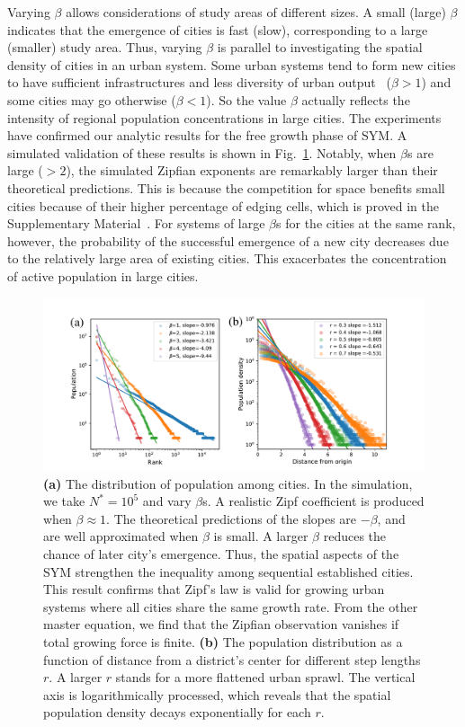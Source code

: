\documentclass[reprint,unsortedaddress,amsmath,amssymb,aps,prl,showkeys]{revtex4-2}
\begin{document}
Varying $\beta$ allows considerations of study areas of different sizes. A small (large) $\beta$ indicates that the emergence of cities is fast (slow), corresponding to a large (smaller) study area. %
Thus, varying $\beta$ is parallel to investigating the spatial density of cities in an urban system. Some urban systems tend to form new cities to have sufficient infrastructures and less diversity of urban output~\cite{batty2008size} ($\beta > 1$) and some cities may go otherwise ($\beta< 1$). So the value $\beta$ actually reflects the intensity of regional population concentrations in large cities. The experiments have confirmed our analytic results for the free growth phase of SYM. %
A simulated validation of these results is shown in Fig.~\ref{Fig2}. Notably, when $\beta$s are large ($>2$), the simulated Zipfian exponents are remarkably larger than their theoretical predictions. This is because the competition for space benefits small %
cities because of their higher percentage of edging cells, which is proved in the Supplementary Material~\cite{SuppInfo}. For systems of large $\beta$s for the cities at the same rank, however, the probability of the successful emergence of a new city decreases due to the relatively large area of existing cities. This exacerbates the concentration of active population in large cities.%
\begin{figure}[t]
	\centering
	\includegraphics[width = .99\linewidth]{pics/Zipf_Clark.pdf}
	\caption{\textbf{(a)} The distribution of population among cities. In the simulation, we take $N^* = 10^5$ and vary $\beta$s. A realistic Zipf coefficient is produced when $\beta\approx 1$. The theoretical predictions of the slopes are $-\beta$, and are well approximated when $\beta$ is small. A larger $\beta$ reduces the chance of later city's emergence. Thus, the spatial aspects of the SYM strengthen the inequality among sequential established cities. This result confirms that Zipf's law is valid for growing urban systems where all cities share the same growth rate. From the other master equation, we find that the Zipfian observation vanishes if total growing force is finite. \textbf{(b)} The population distribution as a function of distance from a district's center for different step lengths $r$. A larger $r$ stands for a more flattened urban sprawl. The vertical axis is logarithmically processed, which reveals that the spatial population density decays exponentially for each $r$.}
	\label{Fig2}
\end{figure}
\end{document}

